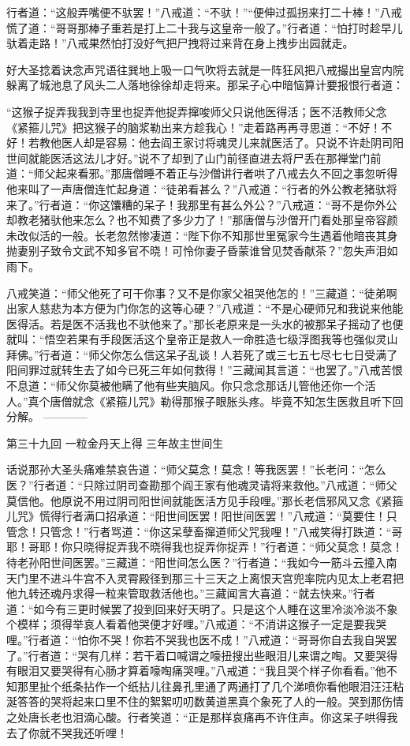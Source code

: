 \documentclass[12pt,UTF8]{ctexbook}
\begin{document}
行者道：“这般弄嘴便不驮罢！”八戒道：“不驮！”“便伸过孤拐来打二十棒！”八戒慌了道：“哥哥那棒子重若是打上二十我与这皇帝一般了。”行者道：“怕打时趁早儿驮着走路！”八戒果然怕打没好气把尸拽将过来背在身上拽步出园就走。

好大圣捻着诀念声咒语往巽地上吸一口气吹将去就是一阵狂风把八戒撮出皇宫内院躲离了城池息了风头二人落地徐徐却走将来。那呆子心中暗恼算计要报恨行者道：

“这猴子捉弄我我到寺里也捉弄他捉弄撺唆师父只说他医得活；医不活教师父念《紧箍儿咒》把这猴子的脑浆勒出来方趁我心！”走着路再再寻思道：“不好！不好！若教他医人却是容易：他去阎王家讨将魂灵儿来就医活了。只说不许赴阴司阳世间就能医活这法儿才好。”说不了却到了山门前径直进去将尸丢在那禅堂门前道：“师父起来看邪。”那唐僧睡不着正与沙僧讲行者哄了八戒去久不回之事忽听得他来叫了一声唐僧连忙起身道：“徒弟看甚么？”八戒道：“行者的外公教老猪驮将来了。”行者道：“你这馕糟的呆子！我那里有甚么外公？”八戒道：“哥不是你外公却教老猪驮他来怎么？也不知费了多少力了！”那唐僧与沙僧开门看处那皇帝容颜未改似活的一般。长老忽然惨凄道：“陛下你不知那世里冤家今生遇着他暗丧其身抛妻别子致令文武不知多官不晓！可怜你妻子昏蒙谁曾见焚香献茶？”忽失声泪如雨下。

八戒笑道：“师父他死了可干你事？又不是你家父祖哭他怎的！”三藏道：“徒弟啊出家人慈悲为本方便为门你怎的这等心硬？”八戒道：“不是心硬师兄和我说来他能医得活。若是医不活我也不驮他来了。”那长老原来是一头水的被那呆子摇动了也便就叫：“悟空若果有手段医活这个皇帝正是救人一命胜造七级浮图我等也强似灵山拜佛。”行者道：“师父你怎么信这呆子乱谈！人若死了或三七五七尽七七日受满了阳间罪过就转生去了如今已死三年如何救得！”三藏闻其言道：“也罢了。”八戒苦恨不息道：“师父你莫被他瞒了他有些夹脑风。你只念念那话儿管他还你一个活人。”真个唐僧就念《紧箍儿咒》勒得那猴子眼胀头疼。毕竟不知怎生医救且听下回分解。
------------

第三十九回 一粒金丹天上得 三年故主世间生

话说那孙大圣头痛难禁哀告道：“师父莫念！莫念！等我医罢！”长老问：“怎么医？”行者道：“只除过阴司查勘那个阎王家有他魂灵请将来救他。”八戒道：“师父莫信他。他原说不用过阴司阳世间就能医活方见手段哩。”那长老信邪风又念《紧箍儿咒》慌得行者满口招承道：“阳世间医罢！阳世间医罢！”八戒道：“莫要住！只管念！只管念！”行者骂道：“你这呆孽畜撺道师父咒我哩！”八戒笑得打跌道：“哥耶！哥耶！你只晓得捉弄我不晓得我也捉弄你捉弄！”行者道：“师父莫念！莫念！待老孙阳世间医罢。”三藏道：“阳世间怎么医？”行者道：“我如今一筋斗云撞入南天门里不进斗牛宫不入灵霄殿径到那三十三天之上离恨天宫兜率院内见太上老君把他九转还魂丹求得一粒来管取救活他也。”三藏闻言大喜道：“就去快来。”行者道：“如今有三更时候罢了投到回来好天明了。只是这个人睡在这里冷淡冷淡不象个模样；须得举哀人看着他哭便才好哩。”八戒道：“不消讲这猴子一定是要我哭哩。”行者道：“怕你不哭！你若不哭我也医不成！”八戒道：“哥哥你自去我自哭罢了。”行者道：“哭有几样：若干着口喊谓之嚎扭搜出些眼泪儿来谓之啕。又要哭得有眼泪又要哭得有心肠才算着嚎啕痛哭哩。”八戒道：“我且哭个样子你看看。”他不知那里扯个纸条拈作一个纸拈儿往鼻孔里通了两通打了几个涕喷你看他眼泪汪汪粘涎答答的哭将起来口里不住的絮絮叨叨数黄道黑真个象死了人的一般。哭到那伤情之处唐长老也泪滴心酸。行者笑道：“正是那样哀痛再不许住声。你这呆子哄得我去了你就不哭我还听哩！
\end{document}
